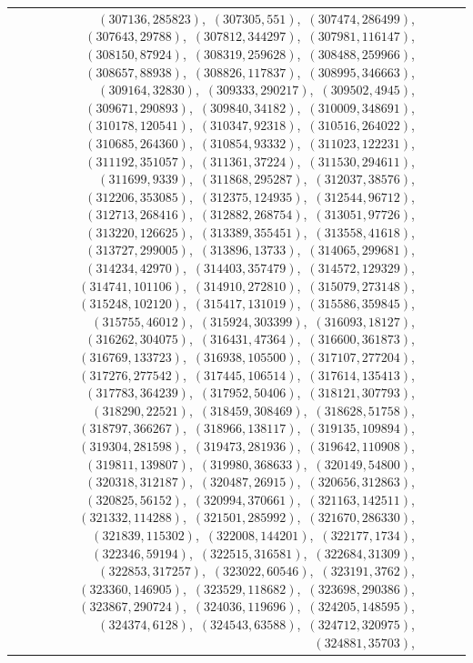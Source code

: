 \documentclass[11pt]{article}
\begin{document}
\begin{longtable}{@{}rrl>{\raggedright\arraybackslash}p{}@{}}
$(307136,285823)$,\allowbreak\ $(307305,551)$,\allowbreak\ $(307474,286499)$,\allowbreak\ $(307643,29788)$,\allowbreak\ $(307812,344297)$,\allowbreak\ $(307981,116147)$,\allowbreak\ $(308150,87924)$,\allowbreak\ $(308319,259628)$,\allowbreak\ $(308488,259966)$,\allowbreak\ $(308657,88938)$,\allowbreak\ $(308826,117837)$,\allowbreak\ $(308995,346663)$,\allowbreak\ $(309164,32830)$,\allowbreak\ $(309333,290217)$,\allowbreak\ $(309502,4945)$,\allowbreak\ $(309671,290893)$,\allowbreak\ $(309840,34182)$,\allowbreak\ $(310009,348691)$,\allowbreak\ $(310178,120541)$,\allowbreak\ $(310347,92318)$,\allowbreak\ $(310516,264022)$,\allowbreak\ $(310685,264360)$,\allowbreak\ $(310854,93332)$,\allowbreak\ $(311023,122231)$,\allowbreak\ $(311192,351057)$,\allowbreak\ $(311361,37224)$,\allowbreak\ $(311530,294611)$,\allowbreak\ $(311699,9339)$,\allowbreak\ $(311868,295287)$,\allowbreak\ $(312037,38576)$,\allowbreak\ $(312206,353085)$,\allowbreak\ $(312375,124935)$,\allowbreak\ $(312544,96712)$,\allowbreak\ $(312713,268416)$,\allowbreak\ $(312882,268754)$,\allowbreak\ $(313051,97726)$,\allowbreak\ $(313220,126625)$,\allowbreak\ $(313389,355451)$,\allowbreak\ $(313558,41618)$,\allowbreak\ $(313727,299005)$,\allowbreak\ $(313896,13733)$,\allowbreak\ $(314065,299681)$,\allowbreak\ $(314234,42970)$,\allowbreak\ $(314403,357479)$,\allowbreak\ $(314572,129329)$,\allowbreak\ $(314741,101106)$,\allowbreak\ $(314910,272810)$,\allowbreak\ $(315079,273148)$,\allowbreak\ $(315248,102120)$,\allowbreak\ $(315417,131019)$,\allowbreak\ $(315586,359845)$,\allowbreak\ $(315755,46012)$,\allowbreak\ $(315924,303399)$,\allowbreak\ $(316093,18127)$,\allowbreak\ $(316262,304075)$,\allowbreak\ $(316431,47364)$,\allowbreak\ $(316600,361873)$,\allowbreak\ $(316769,133723)$,\allowbreak\ $(316938,105500)$,\allowbreak\ $(317107,277204)$,\allowbreak\ $(317276,277542)$,\allowbreak\ $(317445,106514)$,\allowbreak\ $(317614,135413)$,\allowbreak\ $(317783,364239)$,\allowbreak\ $(317952,50406)$,\allowbreak\ $(318121,307793)$,\allowbreak\ $(318290,22521)$,\allowbreak\ $(318459,308469)$,\allowbreak\ $(318628,51758)$,\allowbreak\ $(318797,366267)$,\allowbreak\ $(318966,138117)$,\allowbreak\ $(319135,109894)$,\allowbreak\ $(319304,281598)$,\allowbreak\ $(319473,281936)$,\allowbreak\ $(319642,110908)$,\allowbreak\ $(319811,139807)$,\allowbreak\ $(319980,368633)$,\allowbreak\ $(320149,54800)$,\allowbreak\ $(320318,312187)$,\allowbreak\ $(320487,26915)$,\allowbreak\ $(320656,312863)$,\allowbreak\ $(320825,56152)$,\allowbreak\ $(320994,370661)$,\allowbreak\ $(321163,142511)$,\allowbreak\ $(321332,114288)$,\allowbreak\ $(321501,285992)$,\allowbreak\ $(321670,286330)$,\allowbreak\ $(321839,115302)$,\allowbreak\ $(322008,144201)$,\allowbreak\ $(322177,1734)$,\allowbreak\ $(322346,59194)$,\allowbreak\ $(322515,316581)$,\allowbreak\ $(322684,31309)$,\allowbreak\ $(322853,317257)$,\allowbreak\ $(323022,60546)$,\allowbreak\ $(323191,3762)$,\allowbreak\ $(323360,146905)$,\allowbreak\ $(323529,118682)$,\allowbreak\ $(323698,290386)$,\allowbreak\ $(323867,290724)$,\allowbreak\ $(324036,119696)$,\allowbreak\ $(324205,148595)$,\allowbreak\ $(324374,6128)$,\allowbreak\ $(324543,63588)$,\allowbreak\ $(324712,320975)$,\allowbreak\ $(324881,35703)$,\allowbreak\ 
\end{longtable}
\end{document}
